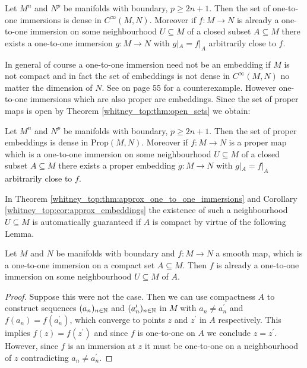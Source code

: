 \begin{theorem}
     \label{whitney_top:thm:approx_one_to_one_immersions}
    Let $M^n$ and $N^p$ be manifolds with boundary, $p \geq 2n + 1$. Then the set of one-to-one immersions is dense in $C^\infty(M,N)$. Moreover if $f \colon M \to N$ is already a one-to-one immersion on some neighbourhood $U \subseteq M$ of a closed subset $A \subseteq M$ there exists a one-to-one immersion $g \colon M \to N$ with $g|_A = f|_A$ arbitrarily close to $f$.
\end{theorem}

In general of course a one-to-one immersion need not be an embedding if $M$ is not compact and in fact the set of embeddings is not dense in $C^\infty(M,N)$ no matter the dimension of $N$. See \cite{hirsch2012differential} on page 55 for a counterexample. However one-to-one immersions which are also proper are embeddings. Since the set of proper maps is open by Theorem \ref{whitney_top:thm:open_sets} we obtain:

\begin{corollary}[Embeddings]
    \label{whitney_top:cor:approx_embeddings}
    Let $M^n$ and $N^p$ be manifolds with boundary, $p \geq 2n+1$. Then the set of proper embeddings is dense in $\mathrm{Prop}(M,N)$. Moreover if $f \colon M \to N$ is a proper map which is a one-to-one immersion on some neighbourhood $U \subseteq M$ of a closed subset $A \subseteq M$ there exists a proper embedding $g \colon M \to N$ with $g|_A = f|_A$ arbitrarily close to $f$.
\end{corollary}

In Theorem \ref{whitney_top:thm:approx_one_to_one_immersions} and Corollary \ref{whitney_top:cor:approx_embeddings} the existence of such a neighbourhood $U \subseteq M$ is automatically guaranteed if $A$ is compact by virtue of the following Lemma.

\begin{lemma}
    \label{whitney_top:lem:lemma_for_existence_of_U}
    Let $M$ and $N$ be manifolds with boundary and $f \colon M \to N$ a smooth map, which is a one-to-one immersion on a compact set $A \subseteq M$. Then $f$ is already a one-to-one immersion on some neighbourhood $U \subseteq M$ of $A$. 
\end{lemma}

\begin{proof}
    Suppose this were not the case. Then we can use compactness $A$ to construct sequences $(a_n)_{n \in \mathbb{N}}$ and $(a_n^\prime)_{n \in \mathbb{N}}$ in $M$ with $a_n \neq a_n^\prime$ and $f(a_n) = f(a_n^\prime)$, which converge to points $z$ and $z^\prime$ in $A$ respectively. This implies $f(z) = f(z^\prime)$ and since $f$ is one-to-one on $A$ we conclude $z = z^\prime$. However, since $f$ is an immersion at $z$ it must be one-to-one on a neighbourhood of $z$ contradicting $a_n \neq a_n^\prime$.
\end{proof}

